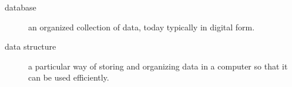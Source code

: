 \myglosslist
\begin{description}
   \item[database] an organized collection of data, today typically in digital form.
   \item[data structure] a particular way of storing and organizing data in a computer so that it can be used efficiently.
\end{description}
